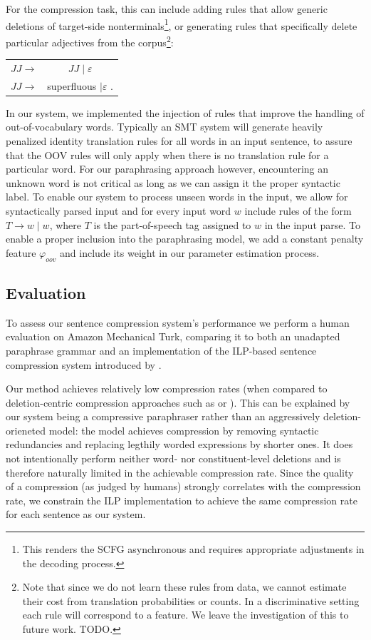 \documentclass[11pt]{article}
\begin{document}
For the compression task, this can include adding rules that allow
generic deletions of target-side nonterminals\footnote{This renders
  the SCFG asynchronous and requires appropriate adjustments in the
  decoding process.}, or generating rules that specifically delete
particular adjectives from the corpus\footnote{Note that since we do
  not learn these rules from data, we cannot estimate their cost from
  translation probabilities or counts. In a discriminative setting
  each rule will correspond to a feature. We leave the investigation
  of this to future work. TODO.}:
\begin{center}
\begin{tabular}{cc}
 $\mathit{JJ} \rightarrow$ & $\mathit{JJ} \mid \varepsilon$ \\
 $\mathit{JJ} \rightarrow$ & superfluous $\mid \varepsilon$ . \\
\end{tabular}
\end{center}
In our system, we implemented the injection of rules that improve the
handling of out-of-vocabulary words. Typically an SMT system will
generate heavily penalized identity translation rules for all words in
an input sentence, to assure that the OOV rules will only apply when
there is no translation rule for a particular word. For our
paraphrasing approach however, encountering an unknown word is not
critical as long as we can assign it the proper syntactic label. To
enable our system to process unseen words in the input, we allow for
syntactically parsed input and for every input word $w$ include rules
of the form $\mathit{T} \rightarrow w \mid w$, where $T$ is the
part-of-speech tag assigned to $w$ in the input parse. To enable a
proper inclusion into the paraphrasing model, we add a constant
penalty feature $\varphi_{\mathit{oov}}$ and include its weight in our
parameter estimation process.

\subsection{Evaluation} \label{evaluation}

To assess our sentence compression system's performance we perform a
human evaluation on Amazon Mechanical Turk, comparing it to both an
unadapted paraphrase grammar and an implementation of the ILP-based
sentence compression system introduced by .

Our method achieves relatively low compression rates (when compared to
deletion-centric compression approaches such as 
or ). This can be explained by our system being a
compressive paraphraser rather than an aggressively deletion-orieneted
model: the model achieves compression by removing syntactic
redundancies and replacing legthily worded expressions by shorter
ones. It does not intentionally perform neither word- nor
constituent-level deletions and is therefore naturally limited in the
achievable compression rate. Since the quality of a compression (as
judged by humans) strongly correlates with the compression rate, we
constrain the ILP implementation to achieve the same compression rate
for each sentence as our system.
\end{document}
